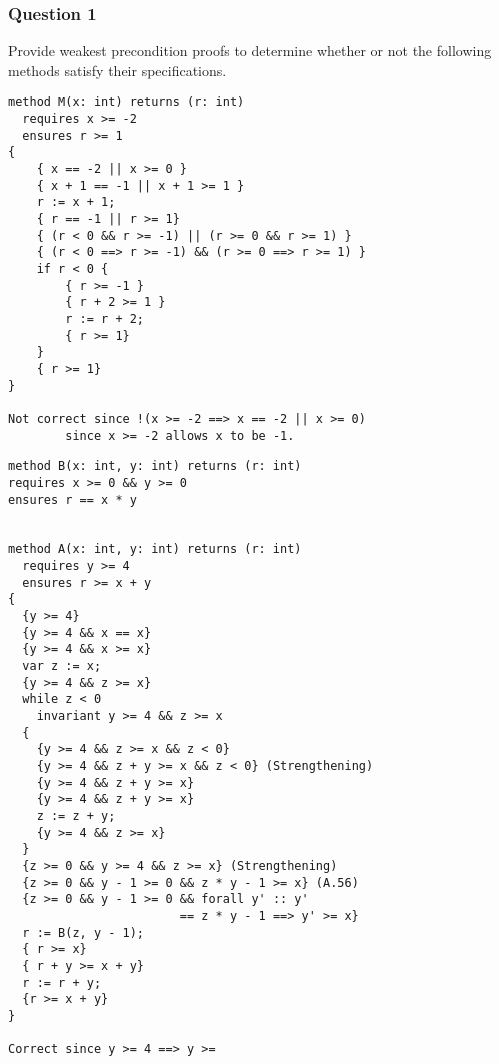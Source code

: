 \subsubsection{Question 1}
Provide weakest precondition proofs to determine whether or not the following methods
satisfy their specifications.
\begin{verbatim}
method M(x: int) returns (r: int)
  requires x >= -2
  ensures r >= 1
{
    { x == -2 || x >= 0 }
    { x + 1 == -1 || x + 1 >= 1 }
    r := x + 1;
    { r == -1 || r >= 1}
    { (r < 0 && r >= -1) || (r >= 0 && r >= 1) }
    { (r < 0 ==> r >= -1) && (r >= 0 ==> r >= 1) }
    if r < 0 {
        { r >= -1 }
        { r + 2 >= 1 }
        r := r + 2;
        { r >= 1}
    }
    { r >= 1}
}

Not correct since !(x >= -2 ==> x == -2 || x >= 0)
        since x >= -2 allows x to be -1.
\end{verbatim}
\begin{verbatim}
method B(x: int, y: int) returns (r: int)
requires x >= 0 && y >= 0
ensures r == x * y


method A(x: int, y: int) returns (r: int)
  requires y >= 4
  ensures r >= x + y
{ 
  {y >= 4}
  {y >= 4 && x == x}
  {y >= 4 && x >= x}
  var z := x;
  {y >= 4 && z >= x}
  while z < 0
    invariant y >= 4 && z >= x
  {
    {y >= 4 && z >= x && z < 0}
    {y >= 4 && z + y >= x && z < 0} (Strengthening)
    {y >= 4 && z + y >= x}
    {y >= 4 && z + y >= x}
    z := z + y;
    {y >= 4 && z >= x}
  }
  {z >= 0 && y >= 4 && z >= x} (Strengthening)
  {z >= 0 && y - 1 >= 0 && z * y - 1 >= x} (A.56)
  {z >= 0 && y - 1 >= 0 && forall y' :: y'
                        == z * y - 1 ==> y' >= x}
  r := B(z, y - 1);
  { r >= x}
  { r + y >= x + y}
  r := r + y;
  {r >= x + y}
}

Correct since y >= 4 ==> y >= 
\end{verbatim}